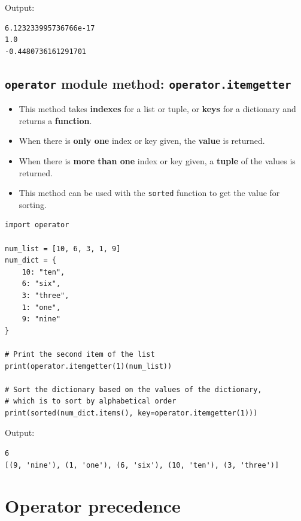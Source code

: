 \documentclass[11pt]{article}
\begin{document}
 \noindent Output:

\begin{verbatim}
6.123233995736766e-17
1.0
-0.4480736161291701
\end{verbatim}


 \newpage

\subsection{\texttt{operator} module method: \texttt{operator.itemgetter}}
\label{sec:org43fae35}
\begin{itemize}
\item This method takes \textbf{indexes} for a list or tuple, or \textbf{keys} for a dictionary and returns a \textbf{function}.
\item When there is \textbf{only one} index or key given, the \textbf{value} is returned.
\item When there is \textbf{more than one} index or key given, a \textbf{tuple} of the values is returned.
\item This method can be used with the \texttt{sorted} function to get the value for sorting.
\end{itemize}

\begin{verbatim}
import operator

num_list = [10, 6, 3, 1, 9]
num_dict = {
    10: "ten",
    6: "six",
    3: "three",
    1: "one",
    9: "nine"
}

# Print the second item of the list
print(operator.itemgetter(1)(num_list))

# Sort the dictionary based on the values of the dictionary,
# which is to sort by alphabetical order
print(sorted(num_dict.items(), key=operator.itemgetter(1)))
\end{verbatim}

 \noindent Output:

\begin{verbatim}
6
[(9, 'nine'), (1, 'one'), (6, 'six'), (10, 'ten'), (3, 'three')]
\end{verbatim}


 \newpage

\section{Operator precedence}
\label{sec:org0016a10}
\end{document}
